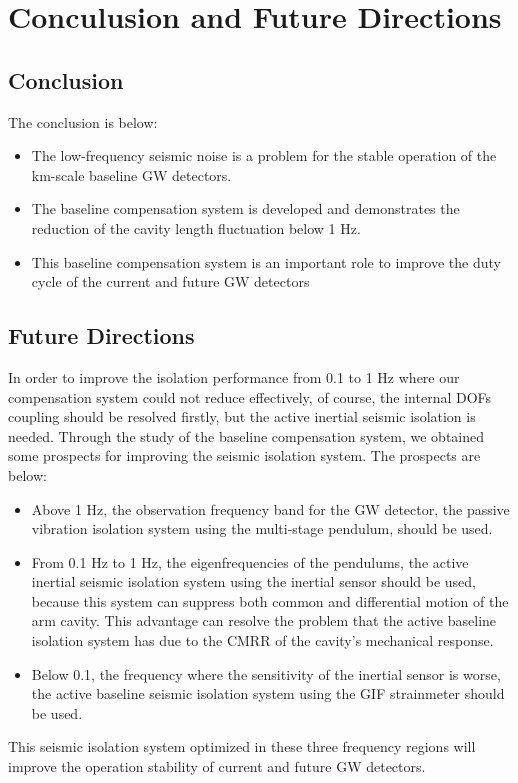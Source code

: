 \chapter{Conculusion and Future Directions} \label{chap6}
\section{Conclusion}
The conclusion is below:
\begin{itemize}
\item The low-frequency seismic noise is a problem for the stable operation of the km-scale baseline GW detectors.
\item The baseline compensation system is developed and demonstrates the reduction of the cavity length fluctuation below 1 Hz.
\item This baseline compensation system is an important role to improve the duty cycle of the current and future GW detectors
\end{itemize}


\section{Future Directions}
In order to improve the isolation performance from 0.1 to 1 Hz where our compensation system could not reduce effectively, of course, the internal DOFs coupling should be resolved firstly, but the active inertial seismic isolation is needed. Through the study of the baseline compensation system, we obtained some prospects for improving the seismic isolation system. The prospects are below:
\begin{itemize}
\item Above 1 Hz, the observation frequency band for the GW detector, the passive vibration isolation system using the multi-stage pendulum, should be used. 
\item From 0.1 Hz to 1 Hz, the eigenfrequencies of the pendulums, the active inertial seismic isolation system using the inertial sensor should be used, because this system can suppress both common and differential motion of the arm cavity. This advantage can resolve the problem that the active baseline isolation system has due to the CMRR of the cavity's mechanical response.
\item Below 0.1, the frequency where the sensitivity of the inertial sensor is worse, the active baseline seismic isolation system using the GIF strainmeter should be used.
\end{itemize}
This seismic isolation system optimized in these three frequency regions will improve the operation stability of current and future GW detectors.
